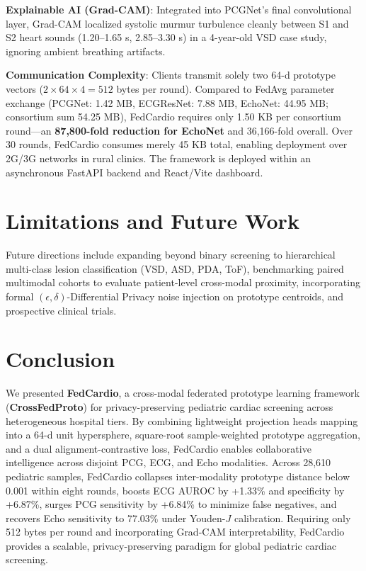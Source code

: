 \documentclass[conference]{IEEEtran}
\begin{document}
\textbf{Explainable AI (Grad-CAM)}: Integrated into PCGNet's final convolutional layer, Grad-CAM localized systolic murmur turbulence cleanly between S1 and S2 heart sounds (1.20--1.65 s, 2.85--3.30 s) in a 4-year-old VSD case study, ignoring ambient breathing artifacts.

\textbf{Communication Complexity}: Clients transmit solely two 64-d prototype vectors ($2 \times 64 \times 4 = 512$ bytes per round). Compared to FedAvg parameter exchange (PCGNet: 1.42 MB, ECGResNet: 7.88 MB, EchoNet: 44.95 MB; consortium sum 54.25 MB), FedCardio requires only 1.50 KB per consortium round—an \textbf{87,800-fold reduction for EchoNet} and 36,166-fold overall. Over 30 rounds, FedCardio consumes merely 45 KB total, enabling deployment over 2G/3G networks in rural clinics. The framework is deployed within an asynchronous FastAPI backend and React/Vite dashboard.

\section{Limitations and Future Work}
Future directions include expanding beyond binary screening to hierarchical multi-class lesion classification (VSD, ASD, PDA, ToF), benchmarking paired multimodal cohorts to evaluate patient-level cross-modal proximity, incorporating formal $(\epsilon, \delta)$-Differential Privacy noise injection on prototype centroids, and prospective clinical trials.

\section{Conclusion}
We presented \textbf{FedCardio}, a cross-modal federated prototype learning framework (\textbf{CrossFedProto}) for privacy-preserving pediatric cardiac screening across heterogeneous hospital tiers. By combining lightweight projection heads mapping into a 64-d unit hypersphere, square-root sample-weighted prototype aggregation, and a dual alignment-contrastive loss, FedCardio enables collaborative intelligence across disjoint PCG, ECG, and Echo modalities. Across 28,610 pediatric samples, FedCardio collapses inter-modality prototype distance below 0.001 within eight rounds, boosts ECG AUROC by +1.33\% and specificity by +6.87\%, surges PCG sensitivity by +6.84\% to minimize false negatives, and recovers Echo sensitivity to 77.03\% under Youden-$J$ calibration. Requiring only 512 bytes per round and incorporating Grad-CAM interpretability, FedCardio provides a scalable, privacy-preserving paradigm for global pediatric cardiac screening.
\end{document}
